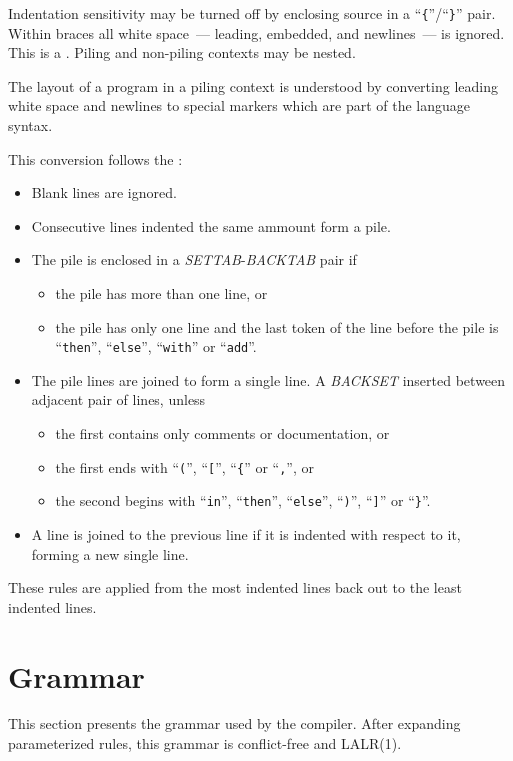 Indentation sensitivity may be turned off by enclosing source
in a ``\verb"{"''/``\verb"}"'' pair.
Within braces all white space~--- leading, embedded, and newlines~---
is ignored.
This is a .
Piling and non-piling contexts may be nested.

The layout of a program in a piling context is understood by converting
leading white space and newlines to special markers
which are part of the language syntax.

This conversion follows the :
\begin{itemize}
\item Blank lines are ignored.
\item Consecutive lines indented the same ammount form a pile.
\item The pile is enclosed in a {\it SETTAB}-{\it BACKTAB} pair if
  \begin{itemize}
  \item the pile has more than one line, or
  \item the pile has only one line and the last token of the line before the
    pile is ``\verb"then"'', ``\verb"else"'', ``\verb"with"'' or ``\verb"add"''.
  \end{itemize}
\item The pile lines are joined to form a single line.
 A {\it BACKSET} inserted between adjacent pair of lines, unless
  \begin{itemize}
  \item the first contains only comments or documentation, or
  \item the first ends with ``\verb"("'', ``\verb"["'',
     ``\verb"{"'' or ``\verb","'', or
  \item the second begins with ``\verb"in"'', ``\verb"then"'',
     ``\verb"else"'', ``\verb")"'', ``\verb"]"'' or ``\verb"}"''.
  \end{itemize}
\item A line is joined to the previous line if it is indented with
  respect to it, forming a new single line.
\end{itemize}
These rules are applied from the most indented lines back out to the least
indented lines.

\clearpage
\section{Grammar}%

This section presents the grammar used by the \asharp{} compiler.
After expanding parameterized rules, this grammar is conflict-free and LALR(1).


